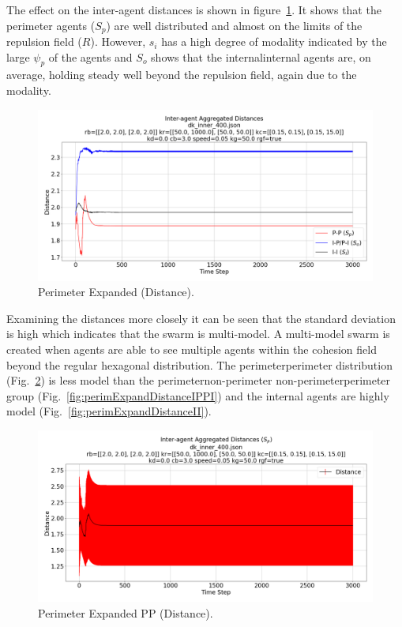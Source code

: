 \documentclass[12pt,a4paper]{IEEEtran}
\newcommand{\rb}{\mathit{R}}
\begin{document}
The effect on the inter-agent distances is shown in figure~\ref{fig:perimExpandDistance}. It shows that the perimeter agents ($S_p$) are well distributed and almost on the limits of the repulsion field ($\rb$). However, $s_i$ has a high degree of modality indicated by the large $\psi_p$ of the agents and $S_o$ shows that the internal\textrightarrow internal agents are, on average, holding steady well beyond the repulsion field, again due to the modality.

\begin{figure}[H]
	\begin{center}
		\includegraphics[width=1.0\linewidth]{figures/innerDistance}
	\end{center}
	\caption{Perimeter Expanded (Distance). \label{fig:perimExpandDistance}}
\end{figure}

Examining the distances more closely it can be seen that the standard deviation is high which indicates that the swarm is multi-model. A multi-model swarm is created when agents are able to see multiple agents within the cohesion field beyond the regular hexagonal distribution. The perimeter\textrightarrow perimeter distribution (Fig.~\ref{fig:perimExpandDistancePP}) is less model than the perimeter\textrightarrow non-perimeter non-perimeter\textrightarrow perimeter group (Fig.~\ref{fig:perimExpandDistanceIPPI}) and the internal agents are highly model (Fig.~\ref{fig:perimExpandDistanceII}).

\begin{figure}[H]
	\begin{center}
		\includegraphics[width=1.0\linewidth]{figures/innerDistancePP}
	\end{center}
	\caption{Perimeter Expanded PP (Distance). \label{fig:perimExpandDistancePP}}
\end{figure}
\end{document}
